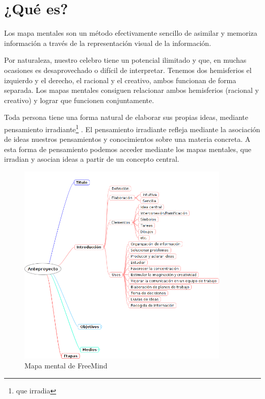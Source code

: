 \section{¿Qué es?}

Los mapa mentales son un método efectivamente sencillo de asimilar y memoriza información a través de la representación visual de la información. 

Por naturaleza, nuestro celebro tiene un potencial ilimitado y que, en muchas ocasiones es desaprovechado o difícil de interpretar. Tenemos dos hemisferios el izquierdo y el derecho, el racional y el creativo, ambos funcionan de forma separada. Los mapas mentales consiguen relacionar ambos hemisferios (racional y creativo) y lograr que funcionen conjuntamente. 

Toda persona tiene una forma natural de elaborar sus propias ideas, mediante pensamiento irradiante\footnote{que irradia} . El pensamiento irradiante refleja mediante la asociación de ideas nuestros pensamientos y conocimientos sobre una materia concreta.  A esta forma de pensamiento podemos acceder mediante los mapas mentales, que irradian y asocian ideas a partir de un concepto central. 

\begin{figure}[htbp]
\centering
\includegraphics[width=0.9\textwidth]{imagenes/freemind}
\caption{Mapa mental de FreeMind}
\label{fig:freemind}
\end{figure}


